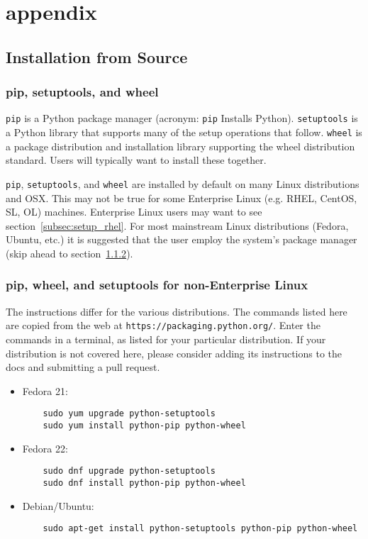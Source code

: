 \chapter{appendix}
\label{ch:appendix}
\lstset{language=Bash}

\section{Installation from Source}
\label{sec:install_from_source}

\subsection{pip, setuptools, and wheel}

\verb|pip| is a Python package manager
(acronym: \verb|pip| Installs Python). 
\verb|setuptools| is a Python library that supports
many of the setup operations that follow.
\verb|wheel| is a package distribution and installation library 
supporting the wheel distribution standard. 
Users will typically want to install these together.

\verb|pip|, \verb|setuptools|, and \verb|wheel| are installed by default 
on many Linux distributions and OSX.
This may not be true for some Enterprise Linux (e.g. RHEL, CentOS, SL, OL) machines.
Enterprise Linux users may want to see section~\ref{subsec:setup_rhel}.
For most mainstream Linux distributions (Fedora, Ubuntu, etc.)
it is suggested that the user employ the system's package manager 
(skip ahead to section~\ref{subsec:setup_non-enterprise}).

\subsection{pip, wheel, and setuptools for non-Enterprise Linux}
\label{subsec:setup_non-enterprise}

The instructions differ for the various distributions.
The commands listed here are copied 
from the web at \verb|https://packaging.python.org/|.
Enter the commands in a terminal, 
as listed for your particular distribution.
If your distribution is not covered here, 
please consider adding its instructions to the docs
and submitting a pull request.

\begin{itemize}
\item Fedora 21: 
    \begin{lstlisting}
    sudo yum upgrade python-setuptools
    sudo yum install python-pip python-wheel
    \end{lstlisting}
\item Fedora 22: 
    \begin{lstlisting}
    sudo dnf upgrade python-setuptools
    sudo dnf install python-pip python-wheel
    \end{lstlisting}
\item Debian/Ubuntu: 
    \begin{lstlisting}
    sudo apt-get install python-setuptools python-pip python-wheel
    \end{lstlisting}
\end{itemize}

